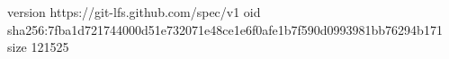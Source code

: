 version https://git-lfs.github.com/spec/v1
oid sha256:7fba1d721744000d51e732071e48ce1e6f0afe1b7f590d0993981bb76294b171
size 121525
